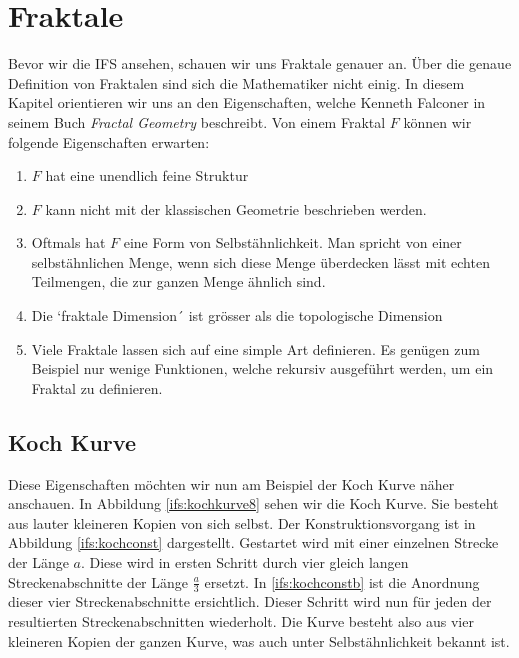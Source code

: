 %
%
%
\section{Fraktale
\label{ifs:section:teil1}}
Bevor wir die IFS ansehen, schauen wir uns Fraktale genauer an.
Über die genaue Definition von Fraktalen sind sich die Mathematiker nicht einig. 
In diesem Kapitel orientieren wir uns an den Eigenschaften, welche Kenneth Falconer in seinem Buch {\em Fractal Geometry} \cite{ifs:fractal-geometry} beschreibt.
Von einem Fraktal $F$ können wir folgende Eigenschaften erwarten: 
\begin{enumerate}
	\item $F$ hat eine unendlich feine Struktur
	\item $F$ kann nicht mit der klassischen Geometrie beschrieben werden.
	\item Oftmals hat $F$ eine Form von Selbstähnlichkeit.
	Man spricht von einer selbstähnlichen Menge, wenn sich diese Menge überdecken lässt mit echten Teilmengen, die zur ganzen Menge ähnlich sind.
	\item Die `fraktale Dimension´ ist grösser als die topologische Dimension
	\item Viele Fraktale lassen sich auf eine simple Art definieren. Es genügen zum Beispiel nur wenige Funktionen, welche rekursiv ausgeführt werden, um ein Fraktal zu definieren.  
\end{enumerate}
\subsection{Koch Kurve
	\label{ifs:subsection:lilkoch}}
Diese Eigenschaften möchten wir nun am Beispiel der Koch Kurve näher anschauen.
In Abbildung \ref{ifs:kochkurve8} sehen wir die Koch Kurve. Sie besteht aus lauter kleineren Kopien von sich selbst. 
Der Konstruktionsvorgang ist in Abbildung \ref{ifs:kochconst} dargestellt.
Gestartet wird mit einer einzelnen Strecke der Länge $a$.
Diese wird in ersten Schritt durch vier gleich langen Streckenabschnitte der Länge $\frac{a}{3}$ ersetzt.
In \ref{ifs:kochconstb} ist die Anordnung dieser vier Streckenabschnitte ersichtlich. 
Dieser Schritt wird nun für jeden der resultierten Streckenabschnitten wiederholt.
Die Kurve besteht also aus vier kleineren Kopien der ganzen Kurve, was auch unter Selbstähnlichkeit bekannt ist.


